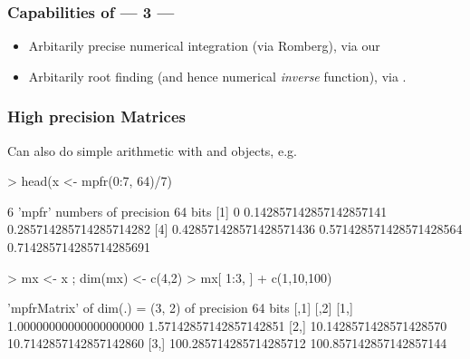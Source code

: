 \begin{frame}[fragile]\frametitle{Capabilities of  --- 3 ---}
  \begin{itemize}
  \item Arbitarily precise numerical integration (via Romberg), via our
    \item Arbitarily root finding (and hence numerical \emph{inverse} function),
      via .
  \end{itemize}
\end{frame}

\begin{frame}[fragile]\frametitle{High precision Matrices}
  Can also do simple arithmetic with  and
   objects, e.g.
\begin{Schunk}
\begin{Sinput}
> head(x <- mpfr(0:7, 64)/7)
\end{Sinput}
\begin{Soutput}
6 'mpfr' numbers of precision  64   bits 
[1]                       0 0.142857142857142857141 0.285714285714285714282
[4] 0.428571428571428571436 0.571428571428571428564 0.714285714285714285691
\end{Soutput}
\begin{Sinput}
> mx <- x ; dim(mx) <- c(4,2)
> mx[ 1:3, ] + c(1,10,100)
\end{Sinput}
\begin{Soutput}
'mpfrMatrix' of dim(.) =  (3, 2) of precision  64   bits 
     [,1]                   [,2]                  
[1,] 1.00000000000000000000 1.57142857142857142851
[2,] 10.1428571428571428570 10.7142857142857142860
[3,] 100.285714285714285712 100.857142857142857144
\end{Soutput}
\end{Schunk}
\end{frame}

